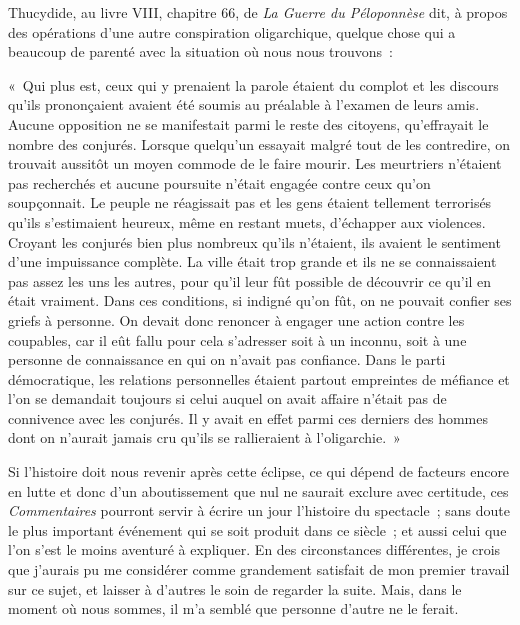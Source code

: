 \documentclass[french,twoside]{book} %
\def\bignobreak{\ifdim\lastskip<\bigskipamount
  \removelastskip\nopagebreak\bigskip\fi}
\newcommand{\labelblock}[1]{\bigbreak{\color{rubric}\noindent\textbf{#1}\par}\bignobreak}
\begin{document}
\noindent Thucydide, au livre VIII, chapitre 66, de \emph{La Guerre du Péloponnèse} dit, à propos des opérations d’une autre conspiration oligarchique, quelque chose qui a beaucoup de parenté avec la situation où nous nous trouvons :\par
« Qui plus est, ceux qui y prenaient la parole étaient du complot et les discours qu’ils prononçaient avaient été soumis au préalable à l’examen de leurs amis. Aucune opposition ne se manifestait parmi le reste des citoyens, qu’effrayait le nombre des conjurés. Lorsque quelqu’un essayait malgré tout de les contredire, on trouvait aussitôt un moyen commode de le faire mourir. Les meurtriers n’étaient pas recherchés et aucune poursuite n’était engagée contre ceux qu’on soupçonnait. Le peuple ne réagissait pas et les gens étaient tellement terrorisés qu’ils s’estimaient heureux, même en restant muets, d’échapper aux violences. Croyant les conjurés bien plus nombreux qu’ils n’étaient, ils avaient le sentiment d’une impuissance complète. La ville était trop grande et ils ne se connaissaient pas assez les uns les autres, pour qu’il leur fût possible de découvrir ce qu’il en était vraiment. Dans ces conditions, si indigné qu’on fût, on ne pouvait confier ses griefs à personne. On devait donc renoncer à engager une action contre les coupables, car il eût fallu pour cela s’adresser soit à un inconnu, soit à une personne de connaissance en qui on n’avait pas confiance. Dans le parti démocratique, les relations personnelles étaient partout empreintes de méfiance et l’on se demandait toujours si celui auquel on avait affaire n’était pas de connivence avec les conjurés. Il y avait en effet parmi ces derniers des hommes dont on n’aurait jamais cru qu’ils se rallieraient à l’oligarchie. »\par
Si l’histoire doit nous revenir après cette éclipse, ce qui dépend de facteurs encore en lutte et donc d’un aboutissement que nul ne saurait exclure avec certitude, ces \emph{Commentaires} pourront servir à écrire un jour l’histoire du spectacle ; sans doute le plus important événement qui se soit produit dans ce siècle ; et aussi celui que l’on s’est le moins aventuré à expliquer. En des circonstances différentes, je crois que j’aurais pu me considérer comme grandement satisfait de mon premier travail sur ce sujet, et laisser à d’autres le soin de regarder la suite. Mais, dans le moment où nous sommes, il m’a semblé que personne d’autre ne le ferait.\par

\labelblock{XXVIII}
\end{document}
